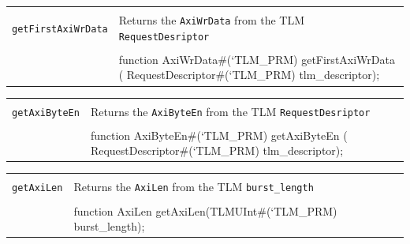 \documentclass[twoside,letterpaper]{article}
\newcommand{\te}[1]{\texttt{#1}}
\newenvironment{libverbatim}
  {\vspace*{-1.0em}
   \verbatim}
  {\endverbatim
  }
\begin{document}
\begin{center}
\begin{tabular}{|p{1.2in}|p{5 in}|}
\hline 
&\\
\te{getFirstAxiWrData}& Returns the \te{AxiWrData} from the TLM 
\te{RequestDesriptor}  \\
&\\
\cline{2-2}
&\begin{libverbatim}
function AxiWrData#(`TLM_PRM) getFirstAxiWrData (
                     RequestDescriptor#(`TLM_PRM) tlm_descriptor);
\end{libverbatim}
\\
\hline
\end{tabular}
\end{center}


\begin{center}
\begin{tabular}{|p{1.2 in}|p{5 in}|}
\hline 
&\\
\te{getAxiByteEn}& Returns the \te{AxiByteEn} from the TLM \te{RequestDesriptor}  \\
&\\
\cline{2-2}
&\begin{libverbatim}
function AxiByteEn#(`TLM_PRM) getAxiByteEn (
                     RequestDescriptor#(`TLM_PRM) tlm_descriptor);
\end{libverbatim}
\\
\hline
\end{tabular}
\end{center}


\begin{center}
\begin{tabular}{|p{1.2 in}|p{5 in}|}
\hline 
&\\
\te{getAxiLen}&Returns the \te{AxiLen} from the TLM \te{burst\_length}   \\
&\\
\cline{2-2}
&\begin{libverbatim}
function AxiLen getAxiLen(TLMUInt#(`TLM_PRM) burst_length);
\end{libverbatim}
\\
\hline
\end{tabular}
\end{center}

\end{document}
